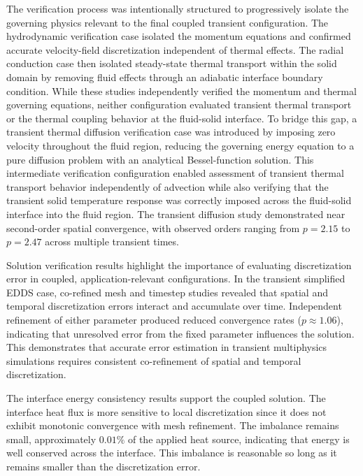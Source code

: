 The verification process was intentionally structured to progressively isolate the governing physics relevant to the final coupled transient configuration. The hydrodynamic verification case isolated the momentum equations and confirmed accurate velocity-field discretization independent of thermal effects. The radial conduction case then isolated steady-state thermal transport within the solid domain by removing fluid effects through an adiabatic interface boundary condition. While these studies independently verified the momentum and thermal governing equations, neither configuration evaluated transient thermal transport or the thermal coupling behavior at the fluid-solid interface. To bridge this gap, a transient thermal diffusion verification case was introduced by imposing zero velocity throughout the fluid region, reducing the governing energy equation to a pure diffusion problem with an analytical Bessel-function solution. This intermediate verification configuration enabled assessment of transient thermal transport behavior independently of advection while also verifying that the transient solid temperature response was correctly imposed across the fluid-solid interface into the fluid region. The transient diffusion study demonstrated near second-order spatial convergence, with observed orders ranging from $p=2.15$ to $p=2.47$ across multiple transient times.

Solution verification results highlight the importance of evaluating discretization error in coupled, application-relevant configurations. In the transient simplified EDDS case, co-refined mesh and timestep studies revealed that spatial and temporal discretization errors interact and accumulate over time. Independent refinement of either parameter produced reduced convergence rates ($p \approx 1.06$), indicating that unresolved error from the fixed parameter influences the solution. This demonstrates that accurate error estimation in transient multiphysics simulations requires consistent co-refinement of spatial and temporal discretization. 

The interface energy consistency results support the coupled solution. The interface heat flux is more sensitive to local discretization since it does not exhibit monotonic convergence with mesh refinement. The imbalance remains small, approximately $0.01\%$ of the applied heat source, indicating that energy is well conserved across the interface. This imbalance is reasonable so long as it remains smaller than the discretization error.


